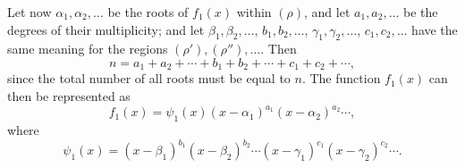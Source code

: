 \documentclass[11pt]{article}
\begin{document}
Let now $\alpha_1,\alpha_2,
\ldots$ be the roots of $f_1(x)$ within $(\rho)$, and let $a_1,a_2,
\ldots$ be the degrees of their multiplicity; and let $\beta_1,\beta_2,
\ldots$, $b_1,b_2,
\ldots$, $\gamma_1,\gamma_2,
\ldots$, $c_1,c_2,
\ldots$ have the same meaning for the regions $(\rho'),(\rho''),\ldots$. Then
\begin{equation}
 n=a_1+a_2+\cdots+b_1+b_2+\cdots+c_1+c_2+\cdots,
\tag{11}
\end{equation}
since the total number of all roots must be equal to $n$. The function $f_1(x)$ can then be represented as
\begin{equation}
 f_1(x)=\psi_1(x)(x-\alpha_1)^{a_1}(x-\alpha_2)^{a_2}\cdots,
\tag{12}
\end{equation}
where
\begin{equation}
 \psi_1(x)=(x-\beta_1)^{b_1}(x-\beta_2)^{b_2}\cdots
          (x-\gamma_1)^{c_1}(x-\gamma_2)^{c_2}\cdots .
\tag{13}
\end{equation}
\end{document}

